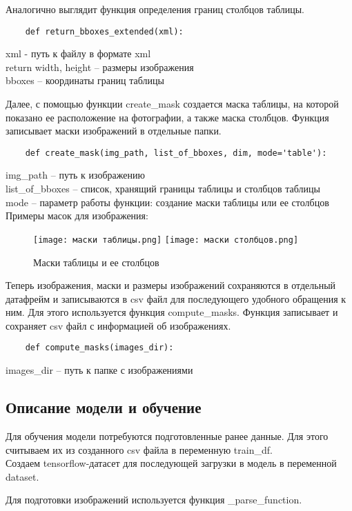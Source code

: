 \documentclass[a4paper, 12pt]{report}
\begin{document}
Аналогично выглядит функция определения границ столбцов таблицы.
\begin{lstlisting}
    def return_bboxes_extended(xml):
\end{lstlisting}
xml - путь к файлу в формате xml\\
return width, height – размеры изображения\\
bboxes – координаты границ таблицы

Далее, с помощью функции create\_mask создается маска таблицы, на которой показано ее расположение на фотографии, а также маска столбцов. Функция записывает маски изображений в отдельные папки.
\begin{lstlisting}
    def create_mask(img_path, list_of_bboxes, dim, mode='table'):
\end{lstlisting}
img\_path – путь к изображению\\
list\_of\_bboxes – список, хранящий границы таблицы и столбцов таблицы\\
mode – параметр работы функции: создание маски таблицы или ее столбцов\\

\pagebreak
Примеры масок для изображения:
\begin{figure}[ht]
    \centering
    \texttt{[image: маски таблицы.png]}
    \texttt{[image: маски столбцов.png]}
    \caption{Маски таблицы и ее столбцов}
    \label{fig:my_label}
\end{figure}

Теперь изображения, маски и размеры изображений сохраняются в отдельный датафрейм и записываются в csv файл для последующего удобного обращения к ним. Для этого используется функция compute\_masks. Функция записывает и сохраняет csv файл с информацией об изображениях.

\begin{lstlisting}
    def compute_masks(images_dir):
\end{lstlisting}
images\_dir – путь к папке с изображениями

\subsection*{Описание модели и обучение}
Для обучения модели потребуются подготовленные ранее данные. Для этого считываем их из созданного csv файла в переменную train\_df.\\
Создаем tensorflow-датасет для последующей загрузки в модель в переменной dataset.

Для подготовки изображений используется функция \_parse\_function.
\end{document}
